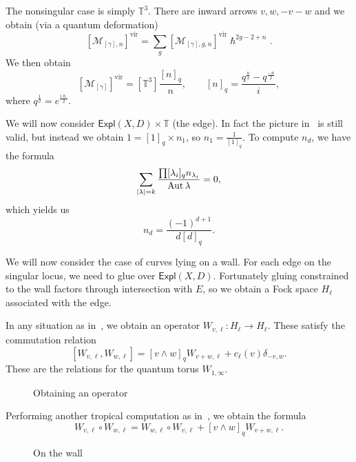 \documentclass[leqno, openany]{memoir}
\theoremstyle{definition}
\theoremstyle{remark}
\theoremstyle{plain}
\theoremstyle{definition}
\theoremstyle{remark}
\newcommand{\mc}[1]{\mathcal{#1}}
\newcommand{\T}{\mathbb{T}}
\newcommand{\mr}[1]{\mathrm{#1}}
\newcommand{\ms}[1]{\mathsf{#1}}
\DeclareMathOperator{\Aut}{Aut}
\begin{document}
The nonsingular case is simply $\T^3$. There are inward arrows $v, w, -v-w$ and we obtain (via a quantum deformation)
\[ [\mc{M}_{[\gamma],n}]^{\mr{vir}} = \sum_g [\mc{M}_{[\gamma],g,n}]^{\mr{vir}} \hslash^{2g-2+n}. \]
We then obtain
\[ [\mc{M}_{[\gamma]}]^{\mr{vir}} = [\T^3] \frac{[n]_q}{n}, \qquad [n]_q = \frac{q^{\frac{n}{2}} - q^{\frac{-n}{2}}}{i}, \]
where $q^{\frac{1}{2}} = e^{\frac{i\hslash}{2}}$. 

We will now consider $\ms{Expl}(X, D) \times \T$ (the edge). In fact the picture in~ is still valid, but instead we obtain $1 = [1]_q \times n_1$, so $n_1 = \frac{1}{[1]_q}$. To compute $n_d$, we have the formula
\[ \sum_{\abs{\lambda} = k} \frac{\prod [ \lambda_i ]_q n_{\lambda_i}}{\Aut \lambda} = 0, \]
which yields us
\[ n_d = \frac{(-1)^{d+1}}{d[d]_q}. \]

We will now consider the case of curves lying on a wall. For each edge on the singular locus, we need to glue over $\ms{Expl}(X, D)$. Fortunately gluing constrained to the wall factors through intersection with $E$, so we obtain a Fock space $H_{\ell}$ associated with the edge.

In any situation as in~, we obtain an operator $W_{v, \ell} \colon H_{\ell} \to H_{\ell}$. These satisfy the commutation relation
\[ [ W_{v,\ell}, W_{w, \ell} ] = [v \wedge w]_{q} W_{v+w, \ell} + c_{\ell}(v) \delta_{-v,w}. \]
These are the relations for the quantum torus $W_{1,\infty}$.
\begin{figure}[htpb]
  \centering
  \caption{Obtaining an operator}
  \label{fig:operator}
\end{figure}

Performing another tropical computation as in~, we obtain the formula
\[ W_{v, \ell} \circ W_{w,\ell} = W_{w,\ell} \circ W_{v,\ell} + [v \wedge w]_q W_{v+w,\ell}. \]
\begin{figure}[htpb]
  \centering
  \caption{On the wall}
  \label{fig:wall}
\end{figure}
\end{document}
